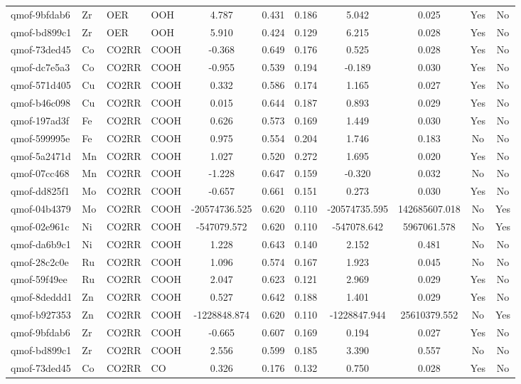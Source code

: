{\begin{longtable}{llllccccccc}
qmof-9bfdab6 & Zr & OER & OOH & 4.787 & 0.431 & 0.186 & 5.042 & 0.025 & Yes & No \\
qmof-bd899c1 & Zr & OER & OOH & 5.910 & 0.424 & 0.129 & 6.215 & 0.028 & Yes & No \\
qmof-73ded45 & Co & CO2RR & COOH & -0.368 & 0.649 & 0.176 & 0.525 & 0.028 & Yes & No \\
qmof-dc7e5a3 & Co & CO2RR & COOH & -0.955 & 0.539 & 0.194 & -0.189 & 0.030 & Yes & No \\
qmof-571d405 & Cu & CO2RR & COOH & 0.332 & 0.586 & 0.174 & 1.165 & 0.027 & Yes & No \\
qmof-b46c098 & Cu & CO2RR & COOH & 0.015 & 0.644 & 0.187 & 0.893 & 0.029 & Yes & No \\
qmof-197ad3f & Fe & CO2RR & COOH & 0.626 & 0.573 & 0.169 & 1.449 & 0.030 & Yes & No \\
qmof-599995e & Fe & CO2RR & COOH & 0.975 & 0.554 & 0.204 & 1.746 & 0.183 & No & No \\
qmof-5a2471d & Mn & CO2RR & COOH & 1.027 & 0.520 & 0.272 & 1.695 & 0.020 & Yes & No \\
qmof-07cc468 & Mn & CO2RR & COOH & -1.228 & 0.647 & 0.159 & -0.320 & 0.032 & No & No \\
qmof-dd825f1 & Mo & CO2RR & COOH & -0.657 & 0.661 & 0.151 & 0.273 & 0.030 & Yes & No \\
qmof-04b4379 & Mo & CO2RR & COOH & -20574736.525 & 0.620 & 0.110 & -20574735.595 & 142685607.018 & No & Yes \\
qmof-02e961c & Ni & CO2RR & COOH & -547079.572 & 0.620 & 0.110 & -547078.642 & 5967061.578 & No & Yes \\
qmof-da6b9c1 & Ni & CO2RR & COOH & 1.228 & 0.643 & 0.140 & 2.152 & 0.481 & No & No \\
qmof-28c2c0e & Ru & CO2RR & COOH & 1.096 & 0.574 & 0.167 & 1.923 & 0.045 & No & No \\
qmof-59f49ee & Ru & CO2RR & COOH & 2.047 & 0.623 & 0.121 & 2.969 & 0.029 & Yes & No \\
qmof-8deddd1 & Zn & CO2RR & COOH & 0.527 & 0.642 & 0.188 & 1.401 & 0.029 & Yes & No \\
qmof-b927353 & Zn & CO2RR & COOH & -1228848.874 & 0.620 & 0.110 & -1228847.944 & 25610379.552 & No & Yes \\
qmof-9bfdab6 & Zr & CO2RR & COOH & -0.665 & 0.607 & 0.169 & 0.194 & 0.027 & Yes & No \\
qmof-bd899c1 & Zr & CO2RR & COOH & 2.556 & 0.599 & 0.185 & 3.390 & 0.557 & No & No \\
qmof-73ded45 & Co & CO2RR & CO & 0.326 & 0.176 & 0.132 & 0.750 & 0.028 & Yes & No \\

\end{longtable}}
